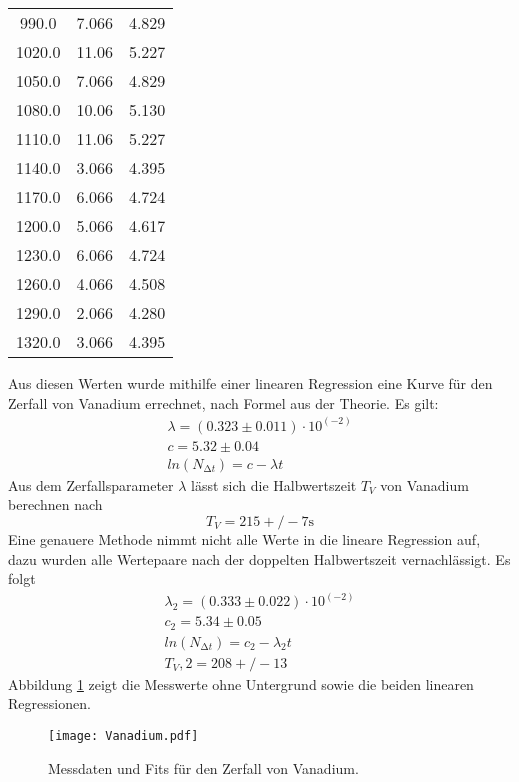 \begin{table}
\begin{tabular}{c c c}
  990.0   & 7.066  & 4.829  \\
  1020.0  & 11.06  & 5.227  \\
  1050.0  & 7.066  & 4.829  \\
  1080.0  & 10.06  & 5.130  \\
  1110.0  & 11.06  & 5.227  \\
  1140.0  & 3.066  & 4.395  \\
  1170.0  & 6.066  & 4.724  \\
  1200.0  & 5.066  & 4.617  \\
  1230.0  & 6.066  & 4.724  \\
  1260.0  & 4.066  & 4.508  \\
  1290.0  & 2.066  & 4.280  \\
  1320.0  & 3.066  & 4.395  \\
  \bottomrule
 \end{tabular}
\end{table}

\noindent Aus diesen Werten wurde mithilfe einer linearen Regression
eine Kurve für den Zerfall von Vanadium errechnet, nach Formel %
aus der Theorie. Es gilt:
\begin{align*}
    \lambda = (0.323 \pm 0.011) \cdot 10^(-2) \\
    c = 5.32 \pm 0.04 \\
    ln(N_{\increment t}) = c - \lambda t 
\end{align*}
Aus dem Zerfallsparameter $\lambda$ lässt sich die Halbwertszeit $T_V$ von
Vanadium berechnen nach %
\begin{equation*}
    T_V = 215+/-7 \si{\s}
\end{equation*}
Eine genauere Methode nimmt nicht alle Werte in die lineare Regression auf,
dazu wurden alle Wertepaare nach der doppelten Halbwertszeit vernachlässigt.
Es folgt
\begin{align*}
    \lambda_2 = (0.333 \pm 0.022) \cdot 10^(-2) \\
    c_2 = 5.34 \pm 0.05 \\
    ln(N_{\increment t}) = c_2 - \lambda_2 t \\
    T_V,2 = 208+/-13
\end{align*}
Abbildung \ref{fig:vankurve}
zeigt die Messwerte ohne Untergrund sowie die beiden linearen Regressionen.

\begin{figure}
 \centering
 \texttt{[image: Vanadium.pdf]}
 \caption{Messdaten und Fits für den Zerfall von Vanadium.}
 \label{fig:vankurve}
\end{figure}

